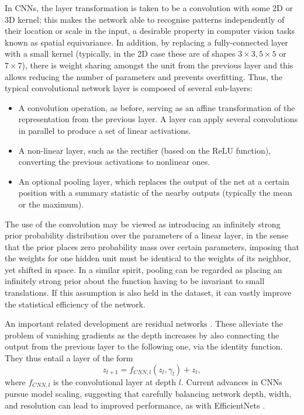  In CNNs, the layer transformation is taken to be a convolution with some 2D or 3D kernel; this makes the network able to recognise patterns independently of their location or scale in the input, a desirable property in computer vision tasks known as spatial equivariance. In addition, by replacing a fully-connected layer with a small kernel (typically, in the 2D case these are of shapes $3\times3, 5\times 5$ or $7\times 7$), there is weight sharing amongst the unit from the previous layer and this allows reducing 
 the number of parameters and prevents overfitting.
 Thus, the typical convolutional network layer is composed of several sub-layers:
 \begin{itemize}
     \item A convolution operation, as before, 
     serving as an affine transformation of the representation from the previous layer. A layer can apply several convolutions in parallel to produce a set of linear activations.
     \item A non-linear layer, such as the rectifier (based on the ReLU function), converting the previous activations to nonlinear ones.
     \item An optional pooling layer, which replaces the output of the net at a certain position with a summary statistic of 
     the nearby outputs (typically the mean or the maximum).  
 \end{itemize}
 
 The use of the convolution may be viewed as introducing an inﬁnitely strong prior probability distribution over the parameters of a linear layer, in the sense that the prior places zero probability mass over certain parameters, imposing that the weights for one hidden unit must be identical to the weights of its neighbor, yet shifted in space. In a 
  similar spirit, pooling can be regarded as placing an inﬁnitely strong prior about the function having to be invariant to small translations. If this assumption is also held in the dataset, it can vastly improve the statistical eﬃciency of the network.
 
 An important related development are residual networks \parencite{he2016deep}. These alleviate the problem of vanishing gradients as the depth increases by also connecting the output from the previous layer to the following one, via the identity function. They thus 
 entail a layer of the form 
$$
z_{l+1} = f_{CNN,l}(z_l, \gamma_l) + z_l ,
$$
where $f_{CNN,l}$ is the convolutional layer at depth $l$. Current advances in CNNs pursue model scaling, suggesting that carefully balancing network depth, width, and resolution can lead to improved performance,
as with EfficientNets \parencite{tan2019efficientnet}.



